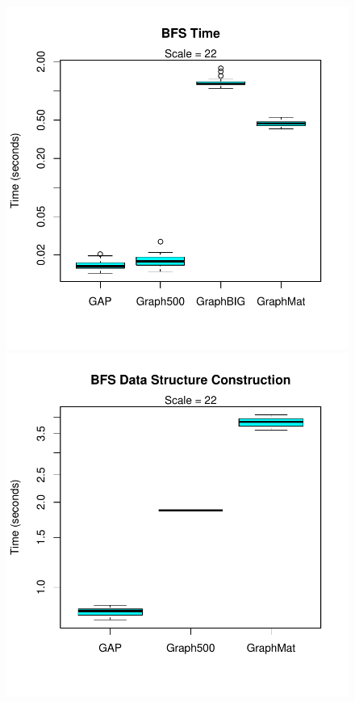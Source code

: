 \documentclass[conference]{IEEEtran}
\begin{document}
\begin{figure}
	\centering
	\begin{minipage}{0.48\linewidth}
		\includegraphics[width=\linewidth, trim=0 36pt 18pt 0, clip]{graphics/bfs_time.pdf}
	\end{minipage}
	\begin{minipage}{0.48\linewidth}
		\includegraphics[width=\linewidth, trim=0 36pt 18pt 0, clip]{graphics/bfs_dsc.pdf}

\end{minipage}
\end{figure}
\end{document}
